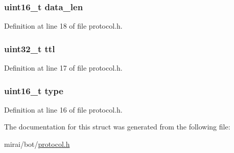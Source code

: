 \subsubsection[{\texorpdfstring{data\+\_\+len}{data_len}}]{\setlength{\rightskip}{0pt plus 5cm}uint16\+\_\+t data\+\_\+len}\hypertarget{structdns__resource_ad1a572736a10ff6b282c5f43c4ea1ccf}{}\label{structdns__resource_ad1a572736a10ff6b282c5f43c4ea1ccf}


Definition at line 18 of file protocol.\+h.

\subsubsection[{\texorpdfstring{ttl}{ttl}}]{\setlength{\rightskip}{0pt plus 5cm}uint32\+\_\+t ttl}\hypertarget{structdns__resource_a48b9f3382e0929bbd75cda2bf2838126}{}\label{structdns__resource_a48b9f3382e0929bbd75cda2bf2838126}


Definition at line 17 of file protocol.\+h.

\subsubsection[{\texorpdfstring{type}{type}}]{\setlength{\rightskip}{0pt plus 5cm}uint16\+\_\+t type}\hypertarget{structdns__resource_acb5cfd209ba75c853d03f701e7f91679}{}\label{structdns__resource_acb5cfd209ba75c853d03f701e7f91679}


Definition at line 16 of file protocol.\+h.



The documentation for this struct was generated from the following file\+:\begin{DoxyCompactItemize}
\item 
mirai/bot/\hyperlink{protocol_8h}{protocol.\+h}\end{DoxyCompactItemize}
